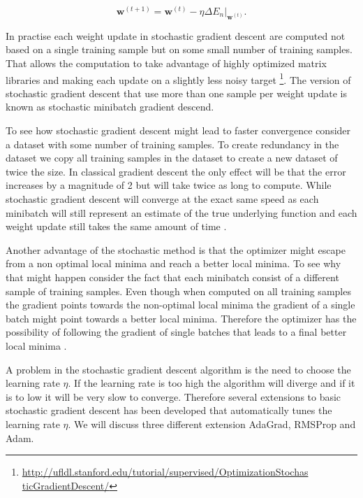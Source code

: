 \begin{equation}
    \mathbf{w}^{(t+1)} =
        \mathbf{\mathbf{w}}^{(t)} -
        \eta\Delta E_n|_{\mathbf{w}^{(t)}}.
\end{equation}

In practise each weight update in stochastic gradient descent are computed
not based on a single training sample but on some small number of training
samples. That allows the computation to take advantage of highly optimized
matrix libraries and making each update on a slightly less noisy target
\footnote{\url{http://ufldl.stanford.edu/tutorial/supervised/OptimizationStochas
ticGradientDescent/}}. The version of stochastic gradient descent that use more
than one sample per weight update is known as stochastic minibatch gradient
descend.

To see how stochastic gradient descent might lead to faster convergence consider
a dataset with some number of training samples. To create redundancy in the
dataset we copy all training samples in the dataset to create a new dataset of
twice the size. In classical gradient descent the only effect will be that the
error increases by a magnitude of 2 but will take twice as long to compute.
While stochastic gradient descent will converge at the exact same speed as each
minibatch will still represent an estimate of the true underlying function and
each weight update still takes the same amount of time \citep{Bishop}.

Another advantage of the stochastic method is that the optimizer might escape
from a non optimal local minima and reach a better local minima. To see why that
might happen consider the fact that each minibatch consist of a different sample
of training samples. Even though when computed on all training samples the
gradient points towards the non-optimal local minima the gradient of a single
batch might point towards a better local minima. Therefore the optimizer has the
possibility of following the gradient of single batches that leads to a final
better local minima \citep{Bishop}.

A problem in the stochastic gradient descent algorithm is the need to choose
the learning rate $\eta$. If the learning rate is too high the algorithm
will diverge and if it is to low it will be very slow to converge. Therefore
several extensions to basic stochastic gradient descent has been developed that
automatically tunes the learning rate $\eta$. We will discuss three different
extension \gls{AdaGrad}, \gls{RMSProp} and \gls{Adam}.

